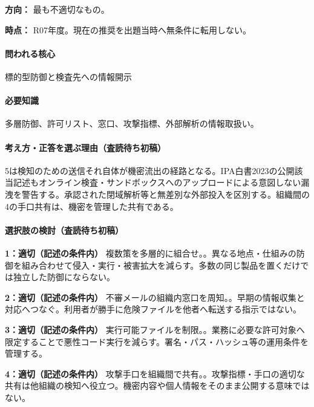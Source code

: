 \noindent\textbf{方向：} 最も不適切なもの。\par

\noindent\textbf{時点：} R07年度。現在の推奨を出題当時へ無条件に転用しない。\par

\paragraph{問われる核心} 標的型防御と検査先への情報開示

\paragraph{必要知識} 多層防御、許可リスト、窓口、攻撃指標、外部解析の情報取扱い。

\paragraph{考え方・正答を選ぶ理由（査読待ち初稿）} 5は検知のための送信それ自体が機密流出の経路となる。IPA白書2023の公開該当記述もオンライン検査・サンドボックスへのアップロードによる意図しない漏洩を警告する。承認された閉域解析等と無差別な外部投入を区別する。組織間の4の手口共有は、機密を管理した共有である。

\paragraph{選択肢の検討（査読待ち初稿）}\mbox{}\par

\noindent\textbf{1：適切（記述の条件内）} 複数策を多層的に組合せ。。異なる地点・仕組みの防御を組み合わせて侵入・実行・被害拡大を減らす。多数の同じ製品を置くだけでは独立した防御にならない。\par

\noindent\textbf{2：適切（記述の条件内）} 不審メールの組織内窓口を周知。。早期の情報収集と対応へつなぐ。利用者が勝手に危険ファイルを他者へ転送する指示ではない。\par

\noindent\textbf{3：適切（記述の条件内）} 実行可能ファイルを制限。。業務に必要な許可対象へ限定することで悪性コード実行を減らす。署名・パス・ハッシュ等の運用条件を管理する。\par

\noindent\textbf{4：適切（記述の条件内）} 攻撃手口を組織間で共有。。攻撃指標・手口の適切な共有は他組織の検知へ役立つ。機密内容や個人情報をそのまま公開する意味ではない。\par

